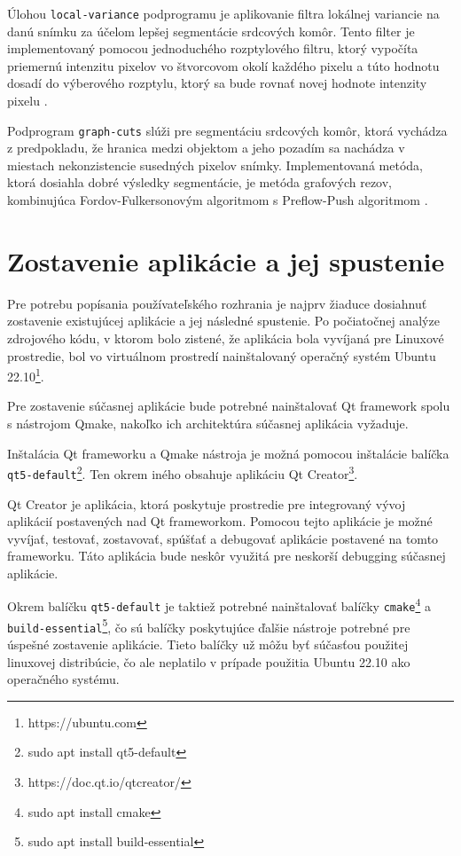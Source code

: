 Úlohou \texttt{local-variance} podprogramu je aplikovanie filtra lokálnej variancie na danú snímku za účelom lepšej segmentácie srdcových komôr. Tento filter je implementovaný pomocou jednoduchého rozptylového filtru, ktorý vypočíta priemernú intenzitu pixelov vo štvorcovom okolí každého pixelu a túto hodnotu dosadí do výberového rozptylu, ktorý sa bude rovnať novej hodnote intenzity pixelu \cite{master_thesis_app}.

Podprogram \texttt{graph-cuts} slúži pre segmentáciu srdcových komôr, ktorá vychádza z predpokladu, že hranica medzi objektom a jeho pozadím sa nachádza v miestach nekonzistencie susedných pixelov snímky. Implementovaná metóda, ktorá dosiahla dobré výsledky segmentácie, je metóda grafových rezov, kombinujúca Fordov-Fulkersonovým algoritmom s Preflow-Push algoritmom \cite{master_thesis_app}.

\section {Zostavenie aplikácie a jej spustenie}
Pre potrebu popísania používateľského rozhrania je najprv žiaduce dosiahnuť zostavenie existujúcej aplikácie a jej následné spustenie. Po počiatočnej analýze zdrojového kódu, v ktorom bolo zistené, že aplikácia bola vyvíjaná pre Linuxové prostredie, bol vo virtuálnom prostredí nainštalovaný operačný systém Ubuntu 22.10\footnote{https://ubuntu.com}.

Pre zostavenie súčasnej aplikácie bude potrebné nainštalovať Qt framework spolu s nástrojom Qmake, nakoľko ich architektúra súčasnej aplikácia vyžaduje.

Inštalácia Qt frameworku a Qmake nástroja je možná pomocou inštalácie balíčka \texttt{qt5-default}\footnote{sudo apt install qt5-default}. Ten okrem iného obsahuje aplikáciu Qt Creator\footnote{https://doc.qt.io/qtcreator/}.

Qt Creator je aplikácia, ktorá poskytuje prostredie pre integrovaný vývoj aplikácií postavených nad Qt frameworkom. \newline Pomocou tejto aplikácie je možné vyvíjať, testovať, zostavovať, spúšťať a debugovať aplikácie postavené na tomto frameworku. Táto aplikácia bude neskôr využitá pre neskorší debugging súčasnej aplikácie.

Okrem balíčku \texttt{qt5-default} je taktiež potrebné nainštalovať balíčky \texttt{cmake}\footnote{sudo apt install cmake} a \texttt{build-essential}\footnote{sudo apt install build-essential}, čo sú balíčky poskytujúce ďalšie nástroje potrebné pre úspešné zostavenie aplikácie. Tieto balíčky už môžu byť súčasťou použitej linuxovej distribúcie, čo ale neplatilo v prípade použitia Ubuntu 22.10 ako operačného systému.

